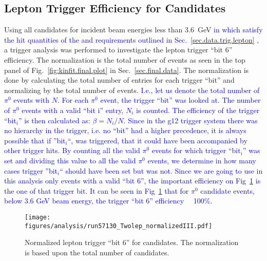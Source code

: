 \subsection{Lepton Trigger Efficiency for \pizT Candidates}\label{sec:analysis.trigger.verify}
Using all \pizT candidates for incident beam energies less than 3.6~GeV \textcolor{blue}{in which satisfy the hit quantities of the and  requirements outlined in Sec.~\ref{sec.data.trig.lepton} }, a trigger analysis was performed to investigate the lepton trigger ``bit 6'' efficiency. The normalization is the total number of 
\pizT events as seen in the top panel of Fig.~\ref{fig:kinfit.final.plot} in Sec.~\ref{sec.final.data}.
The normalization is done by calculating the total number of entries for each trigger ``bit'' and normalizing by the total number of events. \textcolor{blue}{I.e., let us denote the total number of $\pi^0$ events with $N$. For each $\pi^0$ event, the trigger ``bit'' was looked at. The number of $\pi^0$ events with a valid “bit i” entry, $N_i$ is counted. The efficiency of the trigger ``bit$_i$'' is then calculated as: $\beta = N_i/N$. Since in the g12 trigger system there was no hierarchy in the trigger, i.e. no ``bit'' had a higher precedence, it is always possible that if ''bit$_i$``, was triggered, that it could have been accompanied by other trigger hits. By counting all the valid $\pi^0$ events for which trigger ``bit$_i$'' was set and dividing this value to all the valid $\pi^0$ events, we determine in how many cases trigger ''bit$_i$`` should have been set but was not.  Since we are going to use in this analysis only events with a valid ``bit 6'', the important efficiency on Fig~\ref{fig:Leptrigger}  is the one of that trigger bit. It can be seen in Fig~\ref{fig:Leptrigger}  that for $\pi^0$ candidate events, below 3.6 GeV beam energy, the trigger “bit 6” efficiency ~~100\%.} 
							
	\begin{figure}[h!]\begin{center}
		\texttt{[image: \\figures/analysis/run57130\_Twolep\_normalizedIII.pdf]}
		\caption[Normalized Lepton Trigger ``Bit 6'' for \piz candidates]{\label{fig:Leptrigger}Normalized lepton trigger ``bit 6'' for \pizT candidates. The normalization is based upon the total number of \pizT candidates.}
	\end{center}\end{figure} 